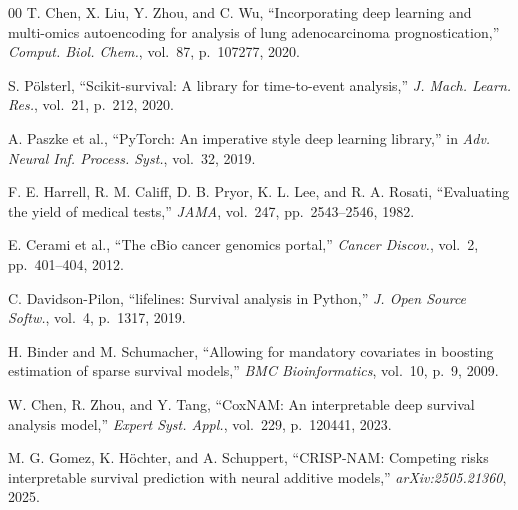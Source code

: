 \documentclass[conference]{IEEEtran}
\begin{document}
\begin{thebibliography}{00}
T. Chen, X. Liu, Y. Zhou, and C. Wu,
``Incorporating deep learning and multi-omics autoencoding for analysis of
lung adenocarcinoma prognostication,''
\textit{Comput. Biol. Chem.}, vol.~87, p.~107277, 2020.

S. P\"{o}lsterl, ``Scikit-survival: A library for time-to-event analysis,''
\textit{J. Mach. Learn. Res.}, vol.~21, p.~212, 2020.

A. Paszke et al., ``PyTorch: An imperative style deep learning library,''
in \textit{Adv. Neural Inf. Process. Syst.}, vol.~32, 2019.

F. E. Harrell, R. M. Califf, D. B. Pryor, K. L. Lee, and R. A. Rosati,
``Evaluating the yield of medical tests,''
\textit{JAMA}, vol.~247, pp.~2543--2546, 1982.

E. Cerami et al., ``The cBio cancer genomics portal,''
\textit{Cancer Discov.}, vol.~2, pp.~401--404, 2012.

C. Davidson-Pilon, ``lifelines: Survival analysis in Python,''
\textit{J. Open Source Softw.}, vol.~4, p.~1317, 2019.

H. Binder and M. Schumacher, ``Allowing for mandatory covariates in
boosting estimation of sparse survival models,''
\textit{BMC Bioinformatics}, vol.~10, p.~9, 2009.

W. Chen, R. Zhou, and Y. Tang, ``CoxNAM: An interpretable deep survival
analysis model,'' \textit{Expert Syst. Appl.}, vol.~229, p.~120441, 2023.

M. G. Gomez, K. H\"{o}chter, and A. Schuppert,
``CRISP-NAM: Competing risks interpretable survival prediction with neural
additive models,'' \textit{arXiv:2505.21360}, 2025.

\end{thebibliography}
\end{document}
